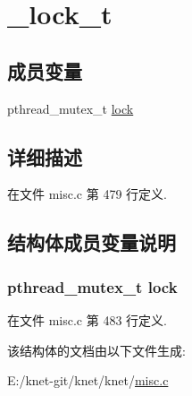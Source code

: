 \hypertarget{struct__lock__t}{}\section{\+\_\+lock\+\_\+t}
\label{struct__lock__t}
\subsection*{成员变量}
\begin{DoxyCompactItemize}
\item 
pthread\+\_\+mutex\+\_\+t \hyperlink{struct__lock__t_a0abaf4b5d42c4e5d19190035fade3599}{lock}
\end{DoxyCompactItemize}


\subsection{详细描述}


在文件 misc.\+c 第 479 行定义.



\subsection{结构体成员变量说明}
\hypertarget{struct__lock__t_a0abaf4b5d42c4e5d19190035fade3599}{}
\subsubsection[{lock}]{\setlength{\rightskip}{0pt plus 5cm}pthread\+\_\+mutex\+\_\+t lock}\label{struct__lock__t_a0abaf4b5d42c4e5d19190035fade3599}


在文件 misc.\+c 第 483 行定义.



该结构体的文档由以下文件生成\+:\begin{DoxyCompactItemize}
\item 
E\+:/knet-\/git/knet/knet/\hyperlink{misc_8c}{misc.\+c}\end{DoxyCompactItemize}
